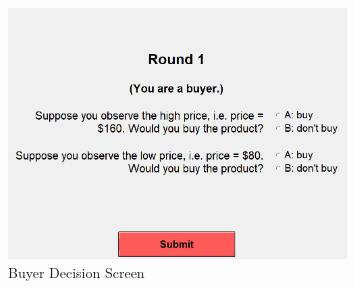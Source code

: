 
\begin{figure}[h]
    \centering
    \includegraphics[width=0.8\textwidth]{../output/zTree Images/buyer decision.png}
    \caption{Buyer Decision Screen}
    \label{buyer_decision_screen}
\end{figure}
